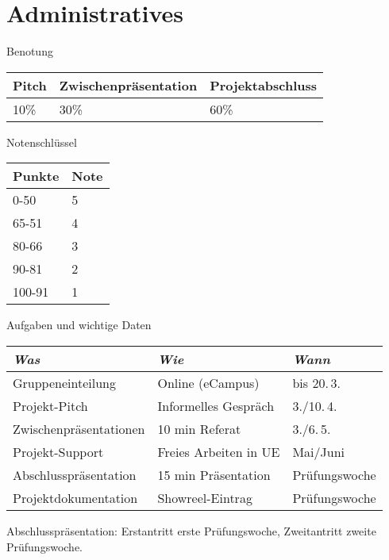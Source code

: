 
\section{Administratives}
 \frame{\sectionpage}

\begin{frame}{Benotung}

 
\begin{table}[]
\begin{tabular}{l|l|l}
Pitch & Zwischenpräsentation & Projektabschluss \\ \hline
10\%  & 30\%                & 60\%       
\end{tabular}
\end{table}



\end{frame}


\begin{frame}{Notenschlüssel}


 
\begin{table}[]
\begin{tabular}{l|l}
Punkte & Note \\ \hline
0-50   & 5    \\
65-51  & 4    \\
80-66  & 3    \\
90-81  & 2    \\
100-91 & 1   
\end{tabular}
\end{table}

\end{frame}


\begin{frame}{Aufgaben und wichtige Daten}
\begin{table}[]
\begin{tabular}{l|l|l}
\emph{Was}             &  \emph{Wie}           & \emph{Wann}	\\ \hline
Gruppeneinteilung      & Online (eCampus)      & bis 20.\,3.   \\
Projekt-Pitch          & Informelles Gespräch  & 3./10.\,4.	\\
Zwischenpräsentationen & 10 min Referat        & 3./6.\,5.	\\
Projekt-Support        & Freies Arbeiten in UE & Mai/Juni	\\
Abschlusspräsentation  & 15 min Präsentation   & Prüfungswoche \\
Projektdokumentation   & Showreel-Eintrag      & Prüfungswoche
\end{tabular}
\end{table}

Abschlusspräsentation: Erstantritt erste Prüfungswoche, Zweitantritt zweite Prüfungswoche.

\end{frame}



